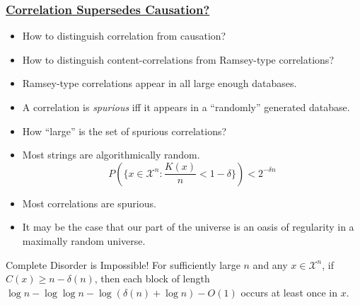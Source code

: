 \documentclass[UTF8,11pt,colorlinks,compress,openany]{beamer}%
\begin{document}
\begin{frame}\frametitle{\href{https://www.cs.auckland.ac.nz/~cristian/crispapers/fos2016.pdf}{Correlation Supersedes Causation?}}\vspace{-1ex}
	\begin{itemize}
		\item How to distinguish correlation from causation?
		\item How to distinguish content-correlations from Ramsey-type correlations?
		\item Ramsey-type correlations appear in all
		large enough databases.
		\item A correlation is \emph{spurious} iff it appears in a ``randomly'' generated database.
		\item How ``large'' is the set of spurious correlations?
		\item Most strings are algorithmically random. 
		\[P\left(\Big\{x\in\mathcal{X}^n: \frac{K(x)}{n}<1-\delta\Big\}\right)<2^{-\delta n}\]
		\item Most correlations are spurious.
		\item It may be the case that our part of the universe is an oasis of regularity in a maximally random universe.
	\end{itemize}\vspace{-1ex}
	\begin{block}{Complete Disorder is Impossible!}
		For sufficiently large $n$ and any $x\in\mathcal{X}^n$, if $C(x)\geq n-\delta(n)$, then each block of length $\log n-\log\log n-\log(\delta(n)+\log n)-O(1)$ occurs at least once in $x$.
	\end{block}
\end{frame}
\end{document}
